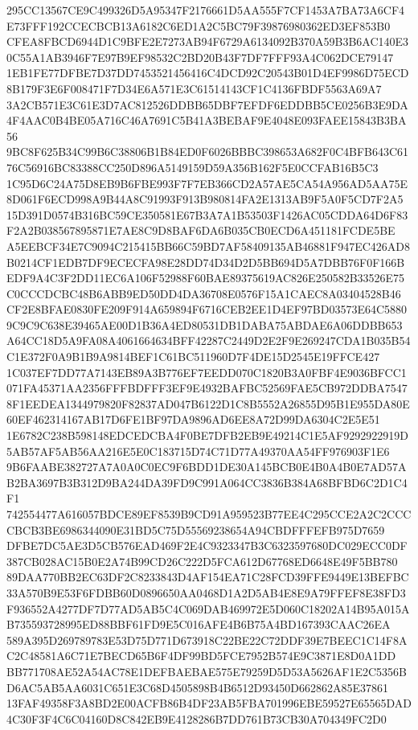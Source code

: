 \documentclass[UTF8,fontset=fandol,zihao=-4,a4paper]{ctexart}
\begin{document}
{{295CC13567CE9C499326D5A95347F2176661D5AA555F7CF1453A7BA73A6CF4E73FFF192CCECBCB13A6182C6ED1A2C5BC79F39876980362ED3EF853B0
CFEA8FBCD6944D1C9BFE2E7273AB94F6729A6134092B370A59B3B6AC140E30C55A1AB3946F7E97B9EF98532C2BD20B43F7DF7FFF93A4C062DCE79147
1EB1FE77DFBE7D37DD7453521456416C4DCD92C20543B01D4EF9986D75ECD8B179F3E6F008471F7D34E6A571E3C61514143CF1C4136FBDF5563A69A7
3A2CB571E3C61E3D7AC812526DDBB65DBF7EFDF6EDDBB5CE0256B3E9DA4F4AAC0B4BE05A716C46A7691C5B41A3BEBAF9E4048E093FAEE15843B3BA56
9BC8F625B34C99B6C38806B1B84ED0F6026BBBC398653A682F0C4BFB643C6176C56916BC83388CC250D896A5149159D59A356B162F5E0CCFAB16B5C3
1C95D6C24A75D8EB9B6FBE993F7F7EB366CD2A57AE5CA54A956AD5AA75E8D061F6ECD998A9B44A8C91993F913B980814FA2E1313AB9F5A0F5CD7F2A5
15D391D0574B316BC59CE350581E67B3A7A1B53503F1426AC05CDDA64D6F83F2A2B038567895871E7AE8C9D8BAF6DA6B035CB0ECD6A451181FCDE5BE
A5EEBCF34E7C9094C215415BB66C59BD7AF58409135AB46881F947EC426AD8B0214CF1EDB7DF9ECECFA98E28DD74D34D2D5BB694D5A7DBB76F0F166B
EDF9A4C3F2DD11EC6A106F52988F60BAE89375619AC826E250582B33526E75C0CCCDCBC48B6ABB9ED50DD4DA36708E0576F15A1CAEC8A03404528B46
CF2E8BFAE0830FE209F914A659894F6716CEB2EE1D4EF97BD03573E64C58809C9C9C638E39465AE00D1B36A4ED80531DB1DABA75ABDAE6A06DDBB653
A64CC18D5A9FA08A4061664634BFF42287C2449D2E2F9E269247CDA1B035B54C1E372F0A9B1B9A9814BEF1C61BC511960D7F4DE15D2545E19FFCE427
1C037EF7DD77A7143EB89A3B776EF7EEDD070C1820B3A0FBF4E9036BFCC1071FA45371AA2356FFFBDFFF3EF9E4932BAFBC52569FAE5CB972DDBA7547
8F1EEDEA1344979820F82837AD047B6122D1C8B5552A26855D95B1E955DA80E60EF462314167AB17D6FE1BF97DA9896AD6EE8A72D99DA6304C2E5E51
1E6782C238B598148EDCEDCBA4F0BE7DFB2EB9E49214C1E5AF9292922919D5AB57AF5AB56AA216E5E0C183715D74C71D77A49370AA54FF976903F1E6
9B6FAABE382727A7A0A0C0EC9F6BDD1DE30A145BCB0E4B0A4B0E7AD57AB2BA3697B3B312D9BA244DA39FD9C991A064CC3836B384A68BFBD6C2D1C4F1
742554477A616057BDCE89EF8539B9CD91A959523B77EE4C295CCE2A2C2CCCCBCB3BE6986344090E31BD5C75D55569238654A94CBDFFFEFB975D7659
DFBE7DC5AE3D5CB576EAD469F2E4C9323347B3C6323597680DC029ECC0DF387CB028AC15B0E2A74B99CD26C222D5FCA612D67768ED6648E49F5BB780
89DAA770BB2EC63DF2C8233843D4AF154EA71C28FCD39FFE9449E13BEFBC33A570B9E53F6FDBB60D0896650AA0468D1A2D5AB4E8E9A79FFEF8E38FD3
F936552A4277DF7D77AD5AB5C4C069DAB469972E5D060C18202A14B95A015AB735593728995ED88BBF61FD9E5C016AFE4B6B75A4BD167393CAAC26EA
589A395D269789783E53D75D771D673918C22BE22C72DDF39E7BEEC1C14F8AC2C48581A6C71E7BECD65B6F4DF99BD5FCE7952B574E9C3871E8D0A1DD
BB771708AE52A54AC78E1DEFBAEBAE575E79259D5D53A5626AF1E2C5356BD6AC5AB5AA6031C651E3C68D4505898B4B6512D93450D662862A85E37861
13FAF49358F3A8BD2E00ACFB86B4DF23AB5FBA701996EBE59527E65565DAD4C30F3F4C6C04160D8C842EB9E4128286B7DD761B73CB30A704349FC2D0
}}
\end{document}
